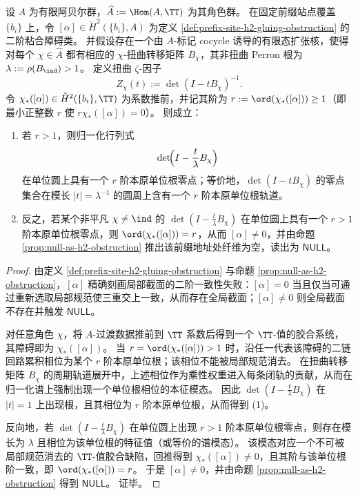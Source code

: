 \begin{theorem}\label{thm:cdim-cech-cyclotomic-quantization}
设 \(A\) 为有限阿贝尔群，\(\widehat A:=\Hom(A,\TT)\) 为其角色群。
在固定前缀站点覆盖 \(\{b_i\}\) 上，令 \([\alpha]\in \check H^2(\{b_i\},A)\) 为定义 \ref{def:prefix-site-h2-gluing-obstruction} 的二阶粘合障碍类。
并假设存在一个由 \(A\)-标记 cocycle 诱导的有限态扩张核，使得对每个 \(\chi\in\widehat A\) 都有相应的 \(\chi\)-扭曲转移矩阵 \(B_\chi\)，其非扭曲 Perron 根为 \(\lambda:=\rho(B_{\ind})>1\)。
定义扭曲 \(\zeta\)-因子
\[
Z_\chi(t):=\det(I-tB_\chi)^{-1}.
\]
令 \(\chi_*([\alpha])\in \check H^2(\{b_i\},\TT)\) 为系数推前，并记其阶为 \(r:=\ord(\chi_*([\alpha]))\ge 1\)（即最小正整数 \(r\) 使 \(r\chi_*([\alpha])=0\)）。
则成立：
\begin{enumerate}
  \item 若 \(r>1\)，则归一化行列式
  \[
  \det\!\Bigl(I-\frac{t}{\lambda}B_\chi\Bigr)
  \]
  在单位圆上具有一个 \(r\) 阶本原单位根零点；等价地，\(\det(I-tB_\chi)\) 的零点集合在模长 \(|t|=\lambda^{-1}\) 的圆周上含有一个 \(r\) 阶本原单位根轨道。
  \item 反之，若某个非平凡 \(\chi\neq \ind\) 的 \(\det(I-\frac{t}{\lambda}B_\chi)\) 在单位圆上具有一个 \(r>1\) 阶本原单位根零点，则 \(\ord(\chi_*([\alpha]))=r\)，从而 \([\alpha]\neq 0\)，并由命题 \ref{prop:null-as-h2-obstruction} 推出该前缀地址处纤维为空，读出为 \(\mathsf{NULL}\)。
\end{enumerate}
\end{theorem}

\begin{proof}
由定义 \ref{def:prefix-site-h2-gluing-obstruction} 与命题 \ref{prop:null-as-h2-obstruction}，\([\alpha]\) 精确刻画局部截面的二阶一致性失败：\([\alpha]=0\) 当且仅当可通过重新选取局部规范使三重交上一致，从而存在全局截面；\([\alpha]\neq 0\) 则全局截面不存在并触发 \(\mathsf{NULL}\)。
\par
对任意角色 \(\chi\)，将 \(A\)-过渡数据推前到 \(\TT\) 系数后得到一个 \(\TT\)-值的胶合系统，其障碍即为 \(\chi_*([\alpha])\)。
当 \(r=\ord(\chi_*([\alpha]))>1\) 时，沿任一代表该障碍的二链回路累积相位为某个 \(r\) 阶本原单位根；该相位不能被局部规范消去。
在扭曲转移矩阵 \(B_\chi\) 的周期轨道展开中，上述相位作为乘性权重进入每条闭轨的贡献，从而在归一化谱上强制出现一个单位根相位的本征模态。
因此 \(\det(I-\frac{t}{\lambda}B_\chi)\) 在 \(|t|=1\) 上出现根，且其相位为 \(r\) 阶本原单位根，从而得到 (1)。
\par
反向地，若 \(\det(I-\frac{t}{\lambda}B_\chi)\) 在单位圆上出现 \(r>1\) 阶本原单位根零点，则存在模长为 \(\lambda\) 且相位为该单位根的特征值（或等价的谱模态）。
该模态对应一个不可被局部规范消去的 \(\TT\)-值胶合缺陷，回推得到 \(\chi_*([\alpha])\neq 0\)，且其阶与该单位根阶一致，即 \(\ord(\chi_*([\alpha]))=r\)。
于是 \([\alpha]\neq 0\)，并由命题 \ref{prop:null-as-h2-obstruction} 得到 \(\mathsf{NULL}\)。
证毕。
\end{proof}

\endinput
